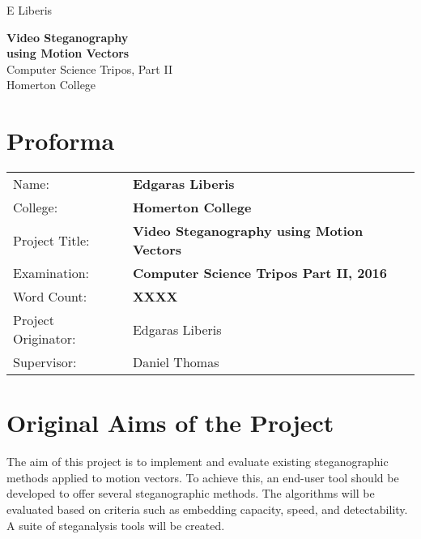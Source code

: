 \documentclass[12pt,british,twoside,notitlepage,usenames,dvipsnames,hypens,final]{report}
\numberwithin{equation}{section}
\numberwithin{figure}{section}
\begin{document}
\pagestyle{empty}

\hfill{\LARGE E Liberis}

\vspace*{60mm}
\begin{center}
\Huge
{\bf Video Steganography \\ using Motion Vectors} \\
\vspace*{10mm}
{ \sc \LARGE
Computer Science Tripos, Part II \\
Homerton College \\
}
\vspace*{10mm}
\the\year 
\end{center}

\cleardoublepage

\setcounter{page}{1}
\pagestyle{plain}

{\section*{\Huge Proforma}}

{\large
\begin{tabular}{ll}
Name:               & \bf Edgaras Liberis                          \\
College:            & \bf Homerton College                         \\
Project Title:      & \bf Video Steganography using Motion Vectors \\
Examination:        & \bf Computer Science Tripos Part II, 2016    \\
Word Count:         & \bf XXXX\footnotemark[1]                     \\
Project Originator: & Edgaras Liberis                              \\
Supervisor:         & Daniel Thomas                                \\ 
\end{tabular}
}
\vspace{0.5cm}

\section*{Original Aims of the Project}

The aim of this project is to implement and evaluate existing steganographic methods applied to motion vectors. To achieve this, an end-user tool should be developed to offer several steganographic methods. The algorithms will be evaluated based on criteria such as embedding capacity, speed, and detectability. A suite of steganalysis tools will be created.   
\end{document}
